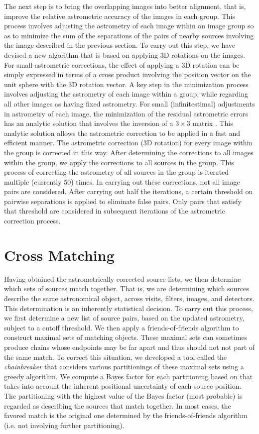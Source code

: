 The next step is to bring the overlapping images into better alignment, that is, improve the relative astrometric accuracy of the images in each group. This process involves adjusting the astrometry of each image within an image group so as to  minimize the sum of the separations of the
pairs of nearby sources involving the image described in the previous section. To carry out this step, we have devised a new algorithm that is based
on applying 3D rotations on the images. For small astrometric corrections, the effect of applying a 3D rotation can be simply expressed in terms
of a cross product involving the position vector on the unit sphere with the 3D rotation vector. A key step in the minimization process involves adjusting the astrometry of each image within a group, while regarding all other images as having fixed astrometry. For small (infinitestimal) adjustments in astrometry of each image, the minimization of the residual astrometric errors has an analytic solution that involves the inversion of a $3 \times 3$ matrix \citep{2012arXiv1206.0644B}. This analytic solution allows the astrometric correction to be applied  in a fast and efficient manner. The astrometric correction (3D rotation) for every image within the group is corrected in this way. After determining the corrections to all images within the group, we apply the corrections  to all sources in the group. This process of correcting the astrometry of all sources in the group is iterated multiple (currently 50) times. In carrying out these corrections, not all image pairs are considered. After carrying out half the iterations, a certain threshold on pairwise separations is applied to eliminate false pairs. Only pairs that satisfy that threshold are considered in  subsequent iterations of the astrometric correction process.

\section{Cross Matching}
Having obtained the astrometrically corrected source lists, we then determine which sets of sources match together. That is, we are determining which sources describe the same astronomical object, across visits, filters, images, and detectors. This determination is an inherently statistical decision. To carry out this process, we first determine a new list of source pairs, based on the updated astrometry, subject to a cutoff threshold. We then apply a friends-of-friends algorithm to construct maximal sets of matching objects. These maximal sets can sometimes produce chains whose endpoints may be far apart and thus should not not part of the same match. To correct this situation, we developed a tool called the {\it chainbreaker} that considers various partitionings of these maximal sets using a greedy algorithm. We compute a Bayes factor for each partitioning based on \cite{2008ApJ...679..301B} that takes into account the inherent positional uncertainty of each source position. The partitioning with the highest value of the Bayes factor (most probable) is regarded as describing the sources that match together. In most cases, the favored match is the original one determined by the friends-of-friends algorithm (i.e. not involving further partitioning). 


